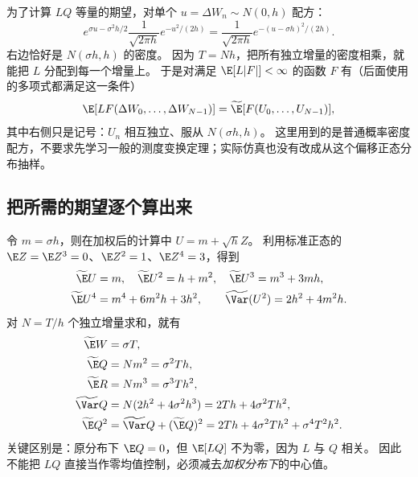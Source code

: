为了计算 $LQ$ 等量的期望，对单个 $u=\Delta W_n\sim N(0,h)$ 配方：
\begin{equation}\label{eq:cv-tilt-density}
 e^{\sigma u-\sigma^2h/2}\frac1{\sqrt{2\pi h}}e^{-u^2/(2h)}
 =\frac1{\sqrt{2\pi h}}e^{-(u-\sigma h)^2/(2h)}.
\end{equation}
右边恰好是 $N(\sigma h,h)$ 的密度。
因为 $T=Nh$，把所有独立增量的密度相乘，就能把 $L$ 分配到每一个增量上。
于是对满足 $\E[L|F|]<\infty$ 的函数 $F$ 有（后面使用的多项式都满足这一条件）
\begin{equation}\label{eq:cv-tilt-identity}
 \E[L F(\Delta W_0,\ldots,\Delta W_{N-1})]
 =\widetilde\E[F(U_0,\ldots,U_{N-1})],
\end{equation}
其中右侧只是记号：$U_n$ 相互独立、服从 $N(\sigma h,h)$。
这里用到的是普通概率密度配方，不要求先学习一般的测度变换定理；实际仿真也没有改成从这个偏移正态分布抽样。

\subsection{把所需的期望逐个算出来}
令 $m=\sigma h$，则在加权后的计算中 $U=m+\sqrt h Z$。
利用标准正态的 $\E Z=\E Z^3=0$、$\E Z^2=1$、$\E Z^4=3$，得到
\begin{align}
 \widetilde\E U&=m,\quad \widetilde\E U^2=h+m^2,
 \quad\widetilde\E U^3=m^3+3mh,\label{eq:cv-gaussian-low}\\
 \widetilde\E U^4&=m^4+6m^2h+3h^2,\qquad
 \widetilde\Var(U^2)=2h^2+4m^2h.\label{eq:cv-gaussian-fourth}
\end{align}
对 $N=T/h$ 个独立增量求和，就有
\begin{align}
 \widetilde\E W&=\sigma T,\label{eq:cv-ew}\\
 \widetilde\E Q&=Nm^2=\sigma^2Th,\label{eq:cv-eq}\\
 \widetilde\E R&=Nm^3=\sigma^3Th^2,\label{eq:cv-er}\\
 \widetilde\Var Q&=N(2h^2+4\sigma^2h^3)=2Th+4\sigma^2Th^2,\label{eq:cv-varq}\\
 \widetilde\E Q^2&=\widetilde\Var Q+(\widetilde\E Q)^2
 =2Th+4\sigma^2Th^2+\sigma^4T^2h^2.\label{eq:cv-eq2}
\end{align}
关键区别是：原分布下 $\E Q=0$，但 $\E[LQ]$ 不为零，因为 $L$ 与 $Q$ 相关。
因此不能把 $LQ$ 直接当作零均值控制，必须减去\emph{加权分布下}的中心值。

